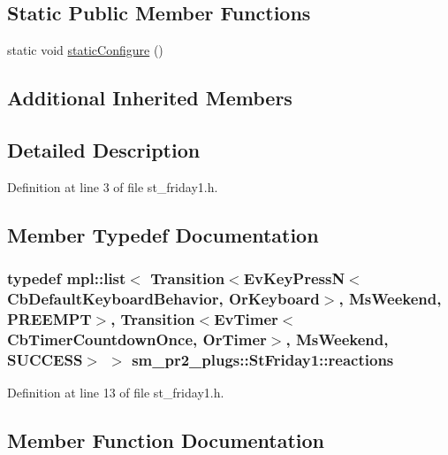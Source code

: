 \subsection*{Static Public Member Functions}
\begin{DoxyCompactItemize}
\item 
static void \hyperlink{structsm__pr2__plugs_1_1StFriday1_a5c4ab1bc3b38917a9f80e1d68123644d}{static\+Configure} ()
\end{DoxyCompactItemize}
\subsection*{Additional Inherited Members}


\subsection{Detailed Description}


Definition at line 3 of file st\+\_\+friday1.\+h.



\subsection{Member Typedef Documentation}
\subsubsection[{\texorpdfstring{reactions}{reactions}}]{\setlength{\rightskip}{0pt plus 5cm}typedef mpl\+::list$<$ Transition$<$Ev\+Key\+PressN$<$Cb\+Default\+Keyboard\+Behavior, {\bf Or\+Keyboard}$>$, {\bf Ms\+Weekend}, {\bf P\+R\+E\+E\+M\+PT}$>$, Transition$<$Ev\+Timer$<$Cb\+Timer\+Countdown\+Once, {\bf Or\+Timer}$>$, {\bf Ms\+Weekend}, {\bf S\+U\+C\+C\+E\+SS}$>$ $>$ {\bf sm\+\_\+pr2\+\_\+plugs\+::\+St\+Friday1\+::reactions}}\hypertarget{structsm__pr2__plugs_1_1StFriday1_abf46be04212b7bc432fd339c0d959232}{}\label{structsm__pr2__plugs_1_1StFriday1_abf46be04212b7bc432fd339c0d959232}


Definition at line 13 of file st\+\_\+friday1.\+h.



\subsection{Member Function Documentation}
